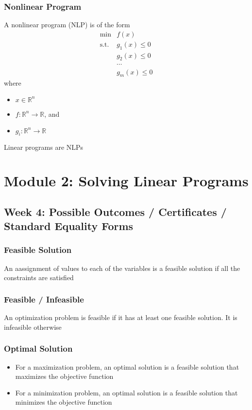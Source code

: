\documentclass[11pt]{article}
\newcommand{\R}{{\mathbb{R}}}
\begin{document}
\subsubsection{Nonlinear Program}
A nonlinear program (NLP) is of the form 
\begin{align*}
  \text{min} &f(x) \\
  \text{s.t.}&g_1(x)\leq0\\
             &g_2(x)\leq0\\
             &\cdots\\
             &g_m(x)\leq0
\end{align*}
where 
\begin{itemize}
  \item $x\in\R^n$
  \item $f:\R^n\rightarrow \R$, and 
  \item $g_i:\R^n\rightarrow \R$
\end{itemize}
Linear programs are NLPs

\section{Module 2: Solving Linear Programs}
\subsection{Week 4: Possible Outcomes / Certificates / Standard Equality Forms}
\subsubsection{Feasible Solution}
An aassignment of values to each of the variables is a feasible solution if all the constraints are satisfied
\subsubsection{Feasible / Infeasible}
An optimization problem is feasible if it has at least one feasible solution. It is infeasible otherwise 
\subsubsection{Optimal Solution}
\begin{itemize}
  \item For a maximization problem, an optimal solution is a feasible solution that maximizes the objective function 
  \item For a minimization problem, an optimal solution is a feasible solution that minimizes the objective function 
\end{itemize}
\end{document}
